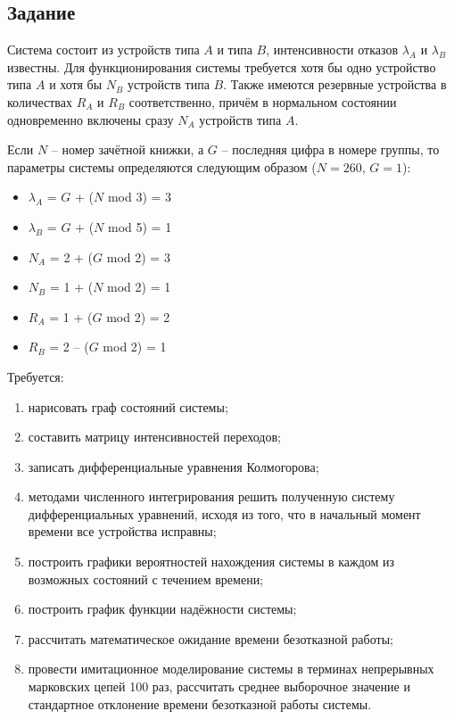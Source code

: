 \subsection*{Задание}\label{sec:Task}

Система состоит из устройств типа $A$ и типа $B$, интенсивности отказов $\lambda_A$ и $\lambda_B$ известны.
Для функционирования системы требуется хотя бы одно устройство типа $A$ и хотя бы $N_B$
устройств типа $B$. Также имеются резервные устройства в количествах $R_A$ и $R_B$
соответственно, причём в нормальном состоянии одновременно включены сразу $N_A$
устройств типа $A$.

Если $N$ – номер зачётной книжки, а $G$ – последняя цифра в номере группы, то параметры
системы определяются следующим образом ($N = 260$, $G = 1$):

\begin{itemize}
        \item $\lambda_A$     = $G$ + ($N$ mod 3)     = 3
        \item $\lambda_B$     = $G$ + ($N$ mod 5)     = 1
        \item $N_A$           = 2 + ($G$ mod 2)       = 3
        \item $N_B$           = 1 + ($N$ mod 2)       = 1
        \item $R_A$           = 1 + ($G$ mod 2)       = 2
        \item $R_B$           = 2 – ($G$ mod 2)       = 1
\end{itemize}

Требуется:

\begin{enumerate}
        \item нарисовать граф состояний системы;
        \item составить матрицу интенсивностей переходов;
        \item записать дифференциальные уравнения Колмогорова;
        \item методами численного интегрирования решить полученную систему дифференциальных уравнений, исходя из того, что в начальный момент времени все устройства исправны;
        \item построить графики вероятностей нахождения системы в каждом из возможных состояний с течением времени;
        \item построить график функции надёжности системы;
        \item рассчитать математическое ожидание времени безотказной работы;
        \item провести имитационное моделирование системы в терминах непрерывных марковских цепей 100 раз, рассчитать среднее выборочное значение и стандартное отклонение времени безотказной работы системы.
\end{enumerate}

\newpage

\newpage
